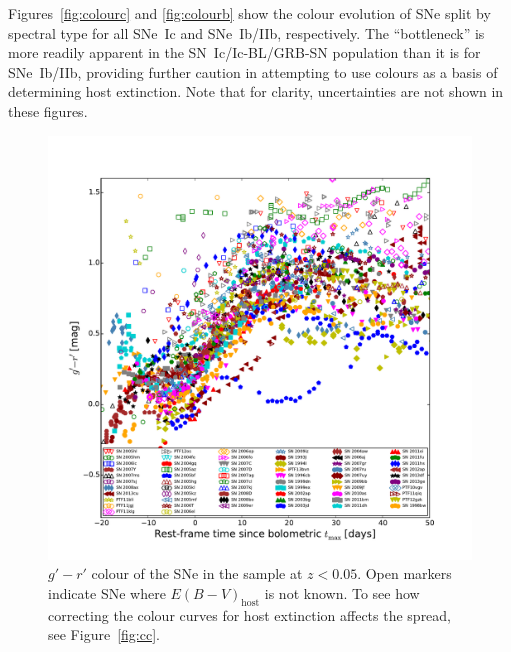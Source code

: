 \documentclass[a4paper,fleqn,usenatbib]{mnras}
\begin{document}
Figures~\ref{fig:colourc} and \ref{fig:colourb} show the colour evolution of SNe split by spectral type for all SNe~Ic and SNe~Ib/IIb, respectively. The ``bottleneck'' is more readily apparent in the SN~Ic/Ic-BL/GRB-SN population than it is for SNe~Ib/IIb, providing further caution in attempting to use colours as a basis of determining host extinction. Note that for clarity, uncertainties are not shown in these figures.

\begin{figure}
\centering
\includegraphics[scale=0.7]{g-r_curves.pdf}
\caption{$g'-r'$ colour of the SNe in the sample at $z<0.05$. Open markers indicate SNe where $E(B-V)_{\mathrm{host}}$ is not known. To see how correcting the colour curves for host extinction affects the spread, see Figure~\ref{fig:cc}.}
\label{fig:colourwith}
\end{figure}
\end{document}
